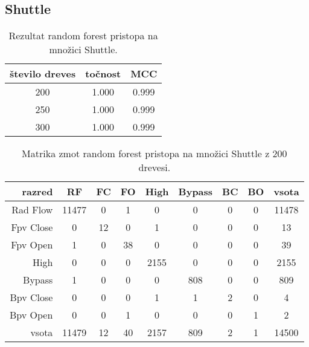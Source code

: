 \subsection{Shuttle}\label{subsec:random-forest-shuttle-test}
\begin{table}[H]
    \begin{center}
        \begin{tabular}{|| c | c c ||}
            \hline
            število dreves & točnost & MCC   \\
            \hline
            200            & 1.000   & 0.999 \\
            \hline
            250            & 1.000   & 0.999 \\
            \hline
            300            & 1.000   & 0.999 \\
            \hline
        \end{tabular}
    \end{center}
    \caption{Rezultat random forest pristopa na množici Shuttle.}
    \label{tab:rforest_shuttle_result}
\end{table}

\begin{table}[H]
    \centering
    \begin{tabular}{||rcccccccc||}
        \hline
        razred    & RF    & FC & FO & High & Bypass & BC & BO & vsota \\ \hline
        Rad Flow  & 11477 & 0  & 1  & 0    & 0      & 0  & 0  & 11478 \\ \hline
        Fpv Close & 0     & 12 & 0  & 1    & 0      & 0  & 0  & 13    \\ \hline
        Fpv Open  & 1     & 0  & 38 & 0    & 0      & 0  & 0  & 39    \\ \hline
        High      & 0     & 0  & 0  & 2155 & 0      & 0  & 0  & 2155  \\ \hline
        Bypass    & 1     & 0  & 0  & 0    & 808    & 0  & 0  & 809   \\ \hline
        Bpv Close & 0     & 0  & 0  & 1    & 1      & 2  & 0  & 4     \\ \hline
        Bpv Open  & 0     & 0  & 1  & 0    & 0      & 0  & 1  & 2     \\ \hline
        vsota     & 11479 & 12 & 40 & 2157 & 809    & 2  & 1  & 14500 \\ \hline
    \end{tabular}
    \caption{Matrika zmot random forest pristopa na množici Shuttle z 200 drevesi.}
    \label{tab:rforest_shuttle_cm_1}
\end{table}

